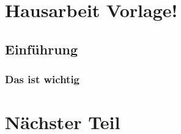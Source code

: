 \section{Hausarbeit Vorlage!}
\blindtext
\subsection{Einführung}
\blindtext
\subsubsection{Das ist wichtig}
\blindtext
\section{Nächster Teil}
\blindtext